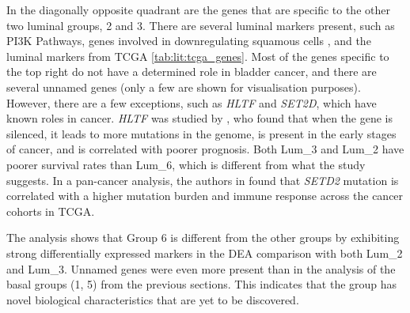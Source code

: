 In the diagonally opposite quadrant are the genes that are specific to the other two luminal groups, 2 and 3. There are several luminal markers present, such as PI3K Pathways, genes involved in downregulating squamous cells \citep{Hurst2022-sp}, and the luminal markers from TCGA \cref{tab:lit:tcga_genes}. Most of the genes specific to the top right do not have a determined role in bladder cancer, and there are several unnamed genes (only a few are shown for visualisation purposes). However, there are a few exceptions, such as \textit{HLTF} and \textit{SET2D}, which have known roles in cancer. \textit{HLTF} was studied by \citep{Dhont2016-vf}, who found that when the gene is silenced, it leads to more mutations in the genome, is present in the early stages of cancer, and is correlated with poorer prognosis. Both Lum\_3 and Lum\_2 have poorer survival rates than Lum\_6, which is different from what the study suggests. In a pan-cancer analysis, the authors in \citep{Lu2021-jt} found that \textit{SETD2} mutation is correlated with a higher mutation burden and immune response across the cancer cohorts in TCGA.

The analysis shows that Group 6 is different from the other groups by exhibiting strong differentially expressed markers in the DEA comparison with both Lum\_2 and Lum\_3. Unnamed genes were even more present than in the analysis of the basal groups (1, 5) from the previous sections. This indicates that the group has novel biological characteristics that are yet to be discovered.


